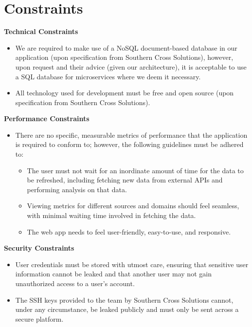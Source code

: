 \documentclass[12pt]{article}
\begin{document}
\newpage

\section{Constraints}

\textbf{Technical Constraints}
\begin{itemize}
  \item We are required to make use of a NoSQL document-based database in our application (upon specification from Southern Cross Solutions), however, upon request and their advice (given our architecture), it is acceptable to use a SQL database for microservices where we deem it necessary.
  \item All technology used for development must be free and open source (upon specification from Southern Cross Solutions).
\end{itemize}

\textbf{Performance Constraints}
\begin{itemize}
  \item There are no specific, measurable metrics of performance that the application is required to conform to; however, the following guidelines must be adhered to:
        \begin{itemize}
          \item The user must not wait for an inordinate amount of time for the data to be refreshed, including fetching new data from external APIs and performing analysis on that data.
          \item Viewing metrics for different sources and domains should feel seamless, with minimal waiting time involved in fetching the data.
          \item The web app needs to feel user-friendly, easy-to-use, and responsive.
        \end{itemize}
\end{itemize}

\textbf{Security Constraints}
\begin{itemize}
  \item User credentials must be stored with utmost care, ensuring that sensitive user information cannot be leaked and that another user may not gain unauthorized access to a user's account.
  \item The SSH keys provided to the team by Southern Cross Solutions cannot, under any circumstance, be leaked publicly and must only be sent across a secure platform.
\end{itemize}
\end{document}
